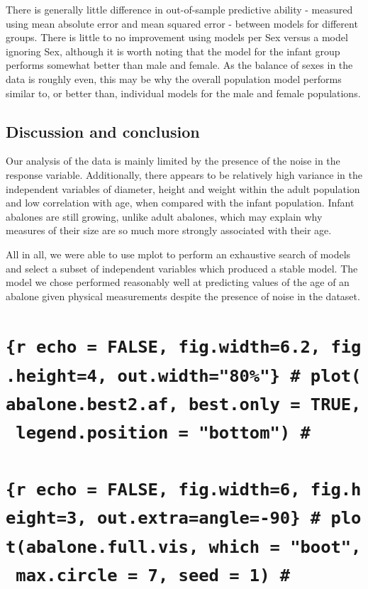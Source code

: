\documentclass[letterpaper,9pt,twocolumn,twoside,]{pinp}
\begin{document}
There is generally little difference in out-of-sample predictive ability
- measured using mean absolute error and mean squared error - between
models for different groups. There is little to no improvement using
models per Sex versus a model ignoring Sex, although it is worth noting
that the model for the infant group performs somewhat better than male
and female. As the balance of sexes in the data is roughly even, this
may be why the overall population model performs similar to, or better
than, individual models for the male and female populations.

\hypertarget{discussion-and-conclusion}{%
\subsection{Discussion and conclusion}\label{discussion-and-conclusion}}

Our analysis of the data is mainly limited by the presence of the noise
in the response variable. Additionally, there appears to be relatively
high variance in the independent variables of diameter, height and
weight within the adult population and low correlation with age, when
compared with the infant population. Infant abalones are still growing,
unlike adult abalones, which may explain why measures of their size are
so much more strongly associated with their age.

All in all, we were able to use mplot to perform an exhaustive search of
models and select a subset of independent variables which produced a
stable model. The model we chose performed reasonably well at predicting
values of the age of an abalone given physical measurements despite the
presence of noise in the dataset.

\hypertarget{r-echo-false-fig.width6.2-fig.height4-out.width80-plotabalone.best2.af-best.only-true-legend.position-bottom}{%
\section{\texorpdfstring{\texttt{\{r\ echo\ =\ FALSE,\ fig.width=6.2,\ fig.height=4,\ out.width="80\%"\}\ \#\ plot(abalone.best2.af,\ best.only\ =\ TRUE,\ legend.position\ =\ "bottom")\ \#}}{\{r echo = FALSE, fig.width=6.2, fig.height=4, out.width="80\%"\} \# plot(abalone.best2.af, best.only = TRUE, legend.position = "bottom") \#}}\label{r-echo-false-fig.width6.2-fig.height4-out.width80-plotabalone.best2.af-best.only-true-legend.position-bottom}}

\hypertarget{r-echo-false-fig.width6-fig.height3-out.extraangle-90-plotabalone.full.vis-which-boot-max.circle-7-seed-1}{%
\section{\texorpdfstring{\texttt{\{r\ echo\ =\ FALSE,\ fig.width=6,\ fig.height=3,\ out.extra=\textquotesingle{}angle=-90\textquotesingle{}\}\ \#\ plot(abalone.full.vis,\ which\ =\ "boot",\ max.circle\ =\ 7,\ seed\ =\ 1)\ \#}}{\{r echo = FALSE, fig.width=6, fig.height=3, out.extra='angle=-90'\} \# plot(abalone.full.vis, which = "boot", max.circle = 7, seed = 1) \#}}\label{r-echo-false-fig.width6-fig.height3-out.extraangle-90-plotabalone.full.vis-which-boot-max.circle-7-seed-1}}
\end{document}
